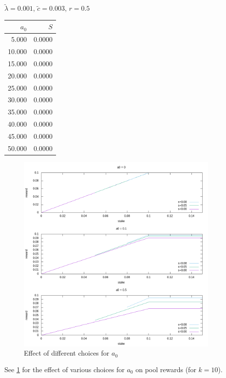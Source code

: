 \documentclass[11pt,a4paper]{article}
\begin{document}
\begin{minipage}[t]{\textwidth}
\begin{minipage}[t]{0.32\textwidth}
        \footnotesize
        \begin{flushleft}$\tilde{\lambda}=0.001$, $\tilde{c}=0.003$, $r=0.5$\end{flushleft}
        \begin{tabular}[t]{rr}
            $a_0$ & $S$ \\
            \hline
             5.000 & 0.0000 \\
            10.000 & 0.0000 \\
            15.000 & 0.0000 \\
            20.000 & 0.0000 \\
            25.000 & 0.0000 \\
            30.000 & 0.0000 \\
            35.000 & 0.0000 \\
            40.000 & 0.0000 \\
            45.000 & 0.0000 \\
            50.000 & 0.0000 \\
        \end{tabular}
    \end{minipage}
\end{minipage}

\begin{figure}
\centering
\includegraphics[width=10cm]{rewards.png}
\caption{Effect of different choices for \(a_0\)}
\label{fig:rewards}
\end{figure}

See \cref{fig:rewards} for the effect of various choices for
\(a_0\) on pool rewards (for \(k=10\)).
\end{document}
